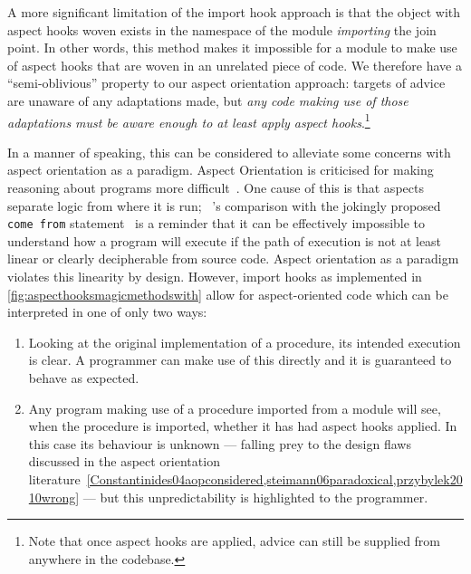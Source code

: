 A more significant limitation of the import hook approach is that the object
with aspect hooks woven exists in the namespace of the module \emph{importing}
the join point. In other words, this method makes it impossible for a module to
make use of aspect hooks that are woven in an unrelated piece of
code.
We therefore have a ``semi-oblivious'' property to our aspect orientation approach:
targets of advice are unaware of any adaptations made, but \emph{any code making
use of those adaptations must be aware enough to at least apply aspect
hooks}.\footnote{Note that once aspect hooks are applied, advice can still be
supplied from anywhere in the codebase.}

In a manner of speaking, this can be considered to alleviate some concerns with
aspect orientation as a paradigm. Aspect Orientation is criticised for making
reasoning about programs more
difficult~\cite{przybylek2010wrong,Constantinides04aopconsidered,steimann06paradoxical}.
One cause of this is that aspects separate logic from where it is run;
\citeauthor{Constantinides04aopconsidered}~'s comparison with the jokingly
proposed \lstinline{come from}
statement~\cite{clark73comefrom,Constantinides04aopconsidered} is a reminder
that it can be effectively impossible to understand how a program will execute
if the path of execution is not at least linear or clearly decipherable from
source code. Aspect orientation as a paradigm violates this
linearity by design. However, import hooks as implemented in
\cref{fig:aspecthooksmagicmethodswith} allow for aspect-oriented code which can be interpreted in
one of only two ways:

\begin{enumerate}
    \item Looking at the original implementation of a procedure, its intended
    execution is clear. A programmer can make use of this directly and it is
    guaranteed to behave as expected.
    \item Any program making use of a procedure imported from a module will see,
    when the procedure is imported, whether it has had aspect hooks applied. In
    this case its behaviour is unknown --- falling prey to the design flaws
    discussed in the aspect orientation
    literature~\cref{Constantinides04aopconsidered,steimann06paradoxical,przybylek2010wrong}
    --- but this unpredictability is highlighted to the
    programmer.
\end{enumerate}

